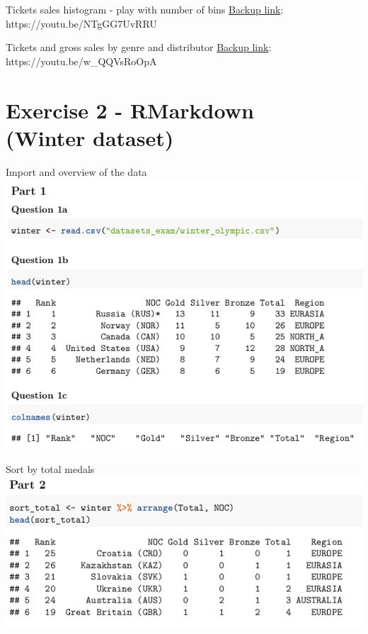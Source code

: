 \documentclass{beamer}
\begin{document}
\begin{frame}{Tickets sales histogram - play with number of bins}
    \href{https://youtu.be/NTgGG7UvRRU}{Backup link}: \footnotesize https://youtu.be/NTgGG7UvRRU
\end{frame}

\begin{frame}{Tickets and gross sales by genre and distributor}
    \href{https://youtu.be/w\_QQVsRoOpA}{Backup link}: \footnotesize https://youtu.be/w\_QQVsRoOpA
\end{frame}


\section{Exercise 2 - RMarkdown\\(Winter dataset)}
\begin{frame}{Import and overview of the data}
    \includegraphics[width=.9\textwidth]{img/ex2_part1_q2.png}
\end{frame}

\begin{frame}{Sort by total medals}
    \includegraphics[width=.8\textwidth]{img/ex2_part2.png}
\end{frame}
\end{document}
